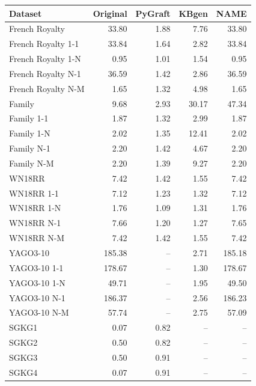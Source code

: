 \begin{tabular}{lrrrr}
\toprule
Dataset & Original & PyGraft & KBgen & NAME \\
\midrule
French Royalty & 33.80 & 1.88 & 7.76 & 33.80 \\
French Royalty 1-1 & 33.84 & 1.64 & 2.82 & 33.84 \\
French Royalty 1-N & 0.95 & 1.01 & 1.54 & 0.95 \\
French Royalty N-1 & 36.59 & 1.42 & 2.86 & 36.59 \\
French Royalty N-M & 1.65 & 1.32 & 4.98 & 1.65 \\
\midrule
Family & 9.68 & 2.93 & 30.17 & 47.34 \\
Family 1-1 & 1.87 & 1.32 & 2.99 & 1.87 \\
Family 1-N & 2.02 & 1.35 & 12.41 & 2.02 \\
Family N-1 & 2.20 & 1.42 & 4.67 & 2.20 \\
Family N-M & 2.20 & 1.39 & 9.27 & 2.20 \\
\midrule
WN18RR & 7.42 & 1.42 & 1.55 & 7.42 \\
WN18RR 1-1 & 7.12 & 1.23 & 1.32 & 7.12 \\
WN18RR 1-N & 1.76 & 1.09 & 1.31 & 1.76 \\
WN18RR N-1 & 7.66 & 1.20 & 1.27 & 7.65 \\
WN18RR N-M & 7.42 & 1.42 & 1.55 & 7.42 \\
\midrule
YAGO3-10 & 185.38 & – & 2.71 & 185.18 \\
YAGO3-10 1-1 & 178.67 & – & 1.30 & 178.67 \\
YAGO3-10 1-N & 49.71 & – & 1.95 & 49.50 \\
YAGO3-10 N-1 & 186.37 & – & 2.56 & 186.23 \\
YAGO3-10 N-M & 57.74 & – & 2.75 & 57.09 \\
\midrule
SGKG1 & 0.07 & 0.82 & – & – \\
SGKG2 & 0.50 & 0.82 & – & – \\
SGKG3 & 0.50 & 0.91 & – & – \\
SGKG4 & 0.07 & 0.91 & – & – \\
\bottomrule
\end{tabular}
